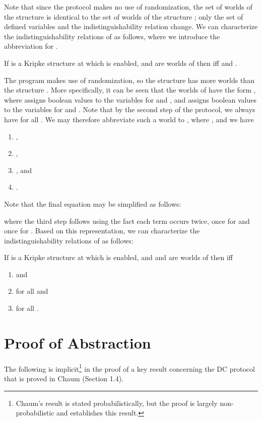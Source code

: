 \documentclass[]{llncs}
\newcommand{\be}{\begin{enumerate}}
\newcommand{\ee}{\end{enumerate}}
\begin{document}
Note that since the protocol  makes no use of randomization, the set of worlds of the structure 
 is identical to the set of worlds of the structure ; only the set of defined variables
and the indistinguishability relation change. We can characterize the indistinguishability relations of 
 as follows, where we introduce the abbreviation  for . 


\begin{lemma} \label{lem:simdca} 
If  is a Kripke structure at which  is enabled, and  are worlds of  then 
 iff  and .
\end{lemma} 


The program  makes use of randomization, so the structure  has more worlds than 
the structure . More specifically, it can be seen that the worlds of   have the form 
, where  assigns boolean values to the variables 
 for  and , and   assigns boolean values to the variables 
 for  and . Note that by the second step of the protocol, we always have 
 for all . We may therefore abbreviate such a world to , 
where , and 
we have 
\be 
\item , 
\item , 
\item , 
and 
\item . 
\ee 
Note that the final equation may be simplified as follows:  
 
where the third step follows using the fact each term  occurs twice, 
once for  and once for . 
Based on this representation, we can characterize the indistinguishability relations of 
 as follows: 

\begin{lemma} \label{lem:simdc} 
If  is a Kripke structure at which  is enabled, and  and  are worlds of  then 
 iff 
\be \item  and 
\item  for all  and 
\item  for all 
. 
\ee 
\end{lemma} 

\section{Proof of Abstraction} \label{sec:abstraction}

The following is implicit\footnote{Chaum's result is stated probabilistically, but the proof is 
largely non-probabilistic and establishes this result.} 
in the proof of a key result concerning the DC protocol that is proved in Chaum \cite{chaum} (Section 1.4).
 
\end{document}
